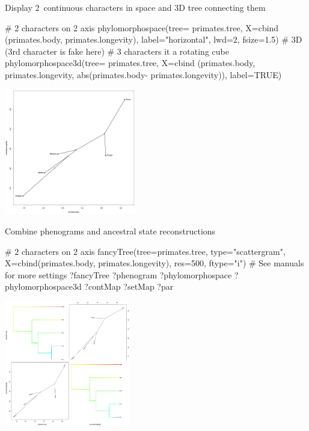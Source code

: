 \documentclass[compress, ucs, xelatex, 11pt, xcolor=svgnames,
  hyperref={
    bookmarks=true,
    unicode=true,
    colorlinks=true,
    pdftitle={Molecular data in R},
    plainpages=false,
    pdfauthor={Vojtech Zeisek},
    pdfsubject={Course about phylogeny and evolution in R},
    pdfcreator={XeLaTeX},
    pdfkeywords={R, evolution, phylogeny, molecular data},
    linkcolor=Tomato,
    anchorcolor=SaddleBrown,
    citecolor=Goldenrod,
    filecolor=DarkMagenta,
    menucolor=Sienna,
    urlcolor=DarkTurquoise,
    pdftex},
  url={hyphens, lowtilde} %
  ]{beamer}
\begin{document}
\begin{frame}[fragile]{Display 2~continuous characters in space and 3D tree connecting them}
\begin{multicols}{2}
  \begin{spluscode}
    # 2 characters on 2 axis
    phylomorphospace(tree=
      primates.tree, X=cbind
      (primates.body,
      primates.longevity),
      label="horizontal",
      lwd=2, fsize=1.5)
    # 3D (3rd character is fake here)
    # 3 characters it a rotating cube
    phylomorphospace3d(tree=
      primates.tree, X=cbind
      (primates.body,
      primates.longevity,
      abs(primates.body-
      primates.longevity)),
      label=TRUE)
  \end{spluscode}
  \begin{center}
    \includegraphics[height=5.5cm]{phylomorphospace.png}
  \end{center}
\end{multicols}
\end{frame}

\begin{frame}[fragile]{Combine phenograms and ancestral state reconstructions}
\begin{multicols}{2}
  \begin{spluscode}
    # 2 characters on 2 axis
    fancyTree(tree=primates.tree,
      type="scattergram",
      X=cbind(primates.body,
      primates.longevity),
      res=500, ftype="i")
    # See manuals for more settings
    ?fancyTree
    ?phenogram
    ?phylomorphospace
    ?phylomorphospace3d
    ?contMap
    ?setMap
    ?par
  \end{spluscode}
  \begin{center}
    \includegraphics[height=5.5cm]{phenogram-ace.png}
  \end{center}
\end{multicols}
\end{frame}
\end{document}
